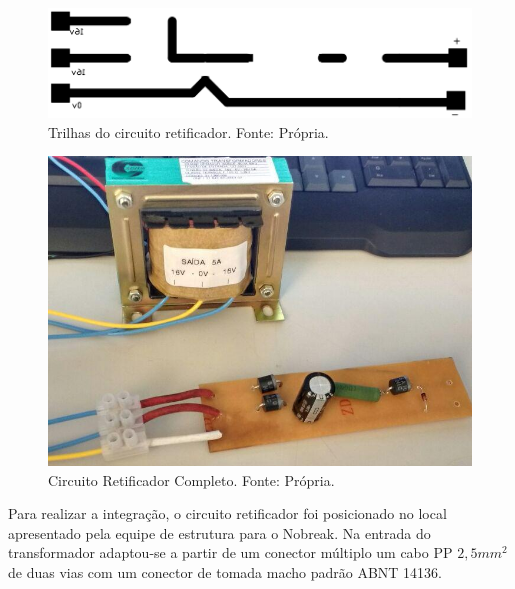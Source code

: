         \begin{figure}[!htb]
            \centering
            \includegraphics[scale= 0.4]{figuras/Fenolite_Retificador.png}
            \caption{Trilhas do circuito retificador. Fonte: Própria.}
            \label{retificador-fenolite}
        \end{figure}	
        
        \begin{figure}[!htb]
            \centering
            \includegraphics[scale= 0.4]{figuras/Circuito_Retificador_Completo.png}
            \caption{Circuito Retificador Completo. Fonte: Própria.}
            \label{retificador-completo2}
        \end{figure}	
        
        Para realizar a integração, o circuito retificador foi posicionado no 							local apresentado pela equipe de estrutura para o Nobreak. Na entrada do 						transformador adaptou-se a partir de um conector múltiplo um cabo PP $2,5mm^2$ 				de duas vias com um conector de tomada macho padrão ABNT 14136.             	

